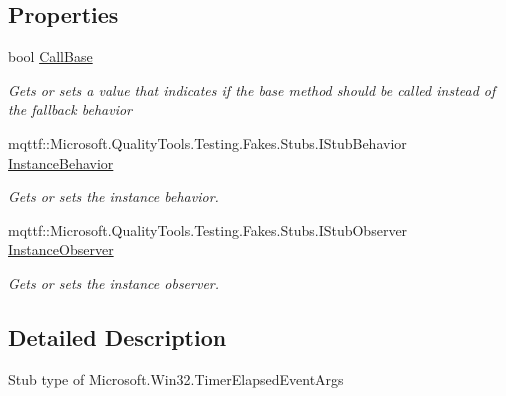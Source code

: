 \subsection*{Properties}
\begin{DoxyCompactItemize}
\item 
bool \hyperlink{class_microsoft_1_1_win32_1_1_fakes_1_1_stub_timer_elapsed_event_args_ad1137bd1b0012cb595d3f6d8cb626862}{Call\-Base}
\begin{DoxyCompactList}\small\item\em Gets or sets a value that indicates if the base method should be called instead of the fallback behavior\end{DoxyCompactList}\item 
mqttf\-::\-Microsoft.\-Quality\-Tools.\-Testing.\-Fakes.\-Stubs.\-I\-Stub\-Behavior \hyperlink{class_microsoft_1_1_win32_1_1_fakes_1_1_stub_timer_elapsed_event_args_ae4386b45f9a89434284bad326dcdbf50}{Instance\-Behavior}
\begin{DoxyCompactList}\small\item\em Gets or sets the instance behavior.\end{DoxyCompactList}\item 
mqttf\-::\-Microsoft.\-Quality\-Tools.\-Testing.\-Fakes.\-Stubs.\-I\-Stub\-Observer \hyperlink{class_microsoft_1_1_win32_1_1_fakes_1_1_stub_timer_elapsed_event_args_a0bd03e41b59b9d9fddce390a746bd5c5}{Instance\-Observer}
\begin{DoxyCompactList}\small\item\em Gets or sets the instance observer.\end{DoxyCompactList}\end{DoxyCompactItemize}


\subsection{Detailed Description}
Stub type of Microsoft.\-Win32.\-Timer\-Elapsed\-Event\-Args



